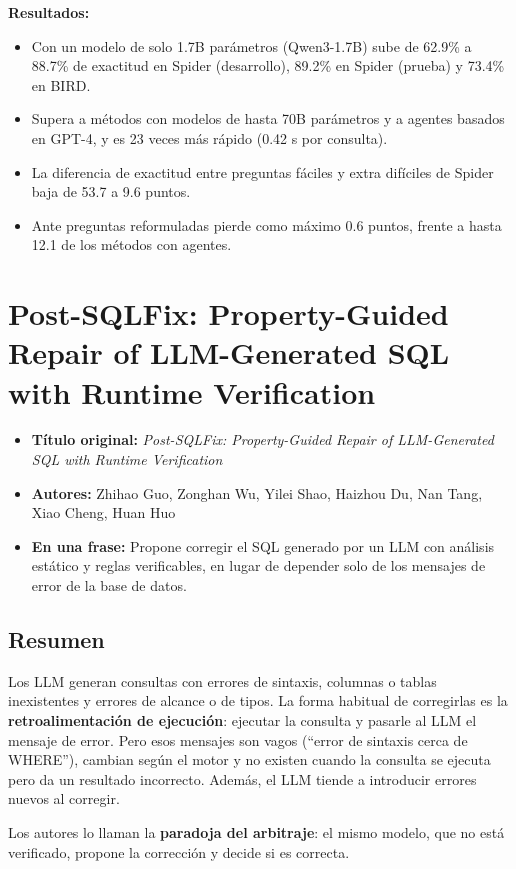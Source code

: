 \documentclass[11pt,a4paper]{article}
\newcommand{\ficha}[5]{%
  \begin{itemize}[leftmargin=*, label={}]
    \item \textbf{Título original:} \textit{#1}
    \item \textbf{Autores:} #2
    \item \textbf{En una frase:} #5
  \end{itemize}
}
\begin{document}
\textbf{Resultados:}
\begin{itemize}
  \item Con un modelo de solo 1.7B parámetros (Qwen3-1.7B) sube de 62.9\% a 88.7\% de exactitud en Spider (desarrollo), 89.2\% en Spider (prueba) y 73.4\% en BIRD.
  \item Supera a métodos con modelos de hasta 70B parámetros y a agentes basados en GPT-4, y es 23 veces más rápido (0.42 s por consulta).
  \item La diferencia de exactitud entre preguntas fáciles y extra difíciles de Spider baja de 53.7 a 9.6 puntos.
  \item Ante preguntas reformuladas pierde como máximo 0.6 puntos, frente a hasta 12.1 de los métodos con agentes.
\end{itemize}

\section{Post-SQLFix: Property-Guided Repair of LLM-Generated SQL with Runtime Verification}
\ficha
  {Post-SQLFix: Property-Guided Repair of LLM-Generated SQL with Runtime Verification}
  {Zhihao Guo, Zonghan Wu, Yilei Shao, Haizhou Du, Nan Tang, Xiao Cheng, Huan Huo}
  {University of Technology Sydney, East China Normal University, Shanghai University of Electric Power, HKUST (Guangzhou) y Macquarie University}
  {arXiv:2610.41472v1 (preprint), octubre 2026}
  {Propone corregir el SQL generado por un LLM con análisis estático y reglas verificables, en lugar de depender solo de los mensajes de error de la base de datos.}

\subsection*{Resumen}
Los LLM generan consultas con errores de sintaxis, columnas o tablas inexistentes y errores de alcance o de tipos. La forma habitual de corregirlas es la \textbf{retroalimentación de ejecución}: ejecutar la consulta y pasarle al LLM el mensaje de error. Pero esos mensajes son vagos (``error de sintaxis cerca de WHERE''), cambian según el motor y no existen cuando la consulta se ejecuta pero da un resultado incorrecto. Además, el LLM tiende a introducir errores nuevos al corregir.

Los autores lo llaman la \textbf{paradoja del arbitraje}: el mismo modelo, que no está verificado, propone la corrección y decide si es correcta.
\end{document}
